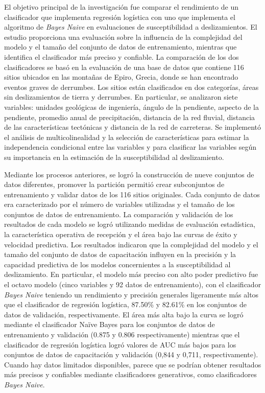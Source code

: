 El objetivo principal de la investigación fue comparar el rendimiento de un clasificador que implementa regresión logística con uno que implementa el algoritmo de \textit{Bayes Naive} en evaluaciones de susceptibilidad a deslizamientos. El estudio proporciona una evaluación sobre la influencia de la complejidad del modelo y el tamaño del conjunto de datos de entrenamiento, mientras que identifica el clasificador más preciso y confiable. La comparación de los dos clasificadores se basó en la evaluación de una base de datos que contiene 116 sitios ubicados en las montañas de Epiro, Grecia, donde se han encontrado eventos graves de derrumbes. Los sitios están clasificados en dos categorías, áreas sin deslizamientos de tierra y derrumbes. En particular, se analizaron siete variables: unidades geológicas de ingeniería, ángulo de la pendiente, aspecto de la pendiente, promedio anual de precipitación, distancia de la red fluvial, distancia de las características tectónicas y distancia de la red de carreteras. Se implementó el análisis de multicolinealidad y la selección de características para estimar la independencia condicional entre las variables y para clasificar las variables según su importancia en la estimación de la susceptibilidad al deslizamiento.

Mediante los procesos anteriores, se logró la construcción de nueve conjuntos de datos diferentes, promover la partición permitió crear subconjuntos de entrenamiento y validar datos de los 116 sitios originales. Cada conjunto de datos era caracterizado por el número de variables utilizadas y el tamaño de los conjuntos de datos de entrenamiento. La comparación y validación de los resultados de cada modelo se logró utilizando medidas de evaluación estadística, la característica operativa de recepción y el área bajo las curvas de éxito y velocidad predictiva. Los resultados indicaron que la complejidad del modelo y el tamaño del conjunto de datos de capacitación influyen en la precisión y la capacidad predictiva de los modelos concernientes a la susceptibilidad al deslizamiento. En particular, el modelo más preciso con alto poder predictivo fue el octavo modelo (cinco variables y 92 datos de entrenamiento), con el clasificador \textit{Bayes Naive} teniendo un rendimiento y precisión generales ligeramente más altos que el clasificador de regresión logística, 87.50\% y 82.61\% en los conjuntos de datos de validación, respectivamente. El área más alta bajo la curva se logró mediante el clasificador Naïve Bayes para los conjuntos de datos de entrenamiento y validación (0.875 y 0.806 respectivamente) mientras que el clasificador de regresión logística logró valores de AUC más bajos para los conjuntos de datos de capacitación y validación (0,844 y 0,711, respectivamente). Cuando hay datos limitados disponibles, parece que se podrían obtener resultados más precisos y confiables mediante clasificadores generativos, como clasificadores \textit{Bayes Naive}.

